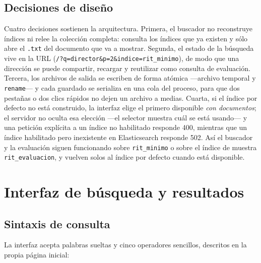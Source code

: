 \documentclass[11pt,spanish]{article}
\begin{document}
\subsection{Decisiones de diseño}
\label{sec:decisiones-arquitectura}

Cuatro decisiones sostienen la arquitectura. Primera, el buscador no
reconstruye índices ni relee la colección completa: consulta los índices que ya
existen y sólo abre el \texttt{.txt} del documento que va a mostrar. Segunda,
el estado de la búsqueda vive en la URL (\texttt{/?q=director\&p=2\&indice=rit\_minimo}),
de modo que una dirección se puede compartir, recargar y reutilizar como
consulta de evaluación. Tercera, los archivos de salida se escriben de forma
atómica ---archivo temporal y \texttt{rename}--- y cada guardado se serializa
en una cola del proceso, para que dos pestañas o dos clics rápidos no dejen un
archivo a medias. Cuarta, si el índice por defecto no está construido, la
interfaz elige el primero disponible \emph{con documentos}; el servidor no
oculta esa elección ---el selector muestra cuál se está usando--- y una petición
explícita a un índice no habilitado responde 400, mientras que un índice
habilitado pero inexistente en Elasticsearch responde 502. Así el buscador y la
evaluación siguen funcionando sobre \texttt{rit\_minimo} o sobre el índice de
muestra \texttt{rit\_evaluacion}, y vuelven solos al índice por defecto cuando
está disponible.

\section{Interfaz de búsqueda y resultados}
\label{sec:busqueda}

\subsection{Sintaxis de consulta}

La interfaz acepta palabras sueltas y cinco operadores sencillos, descritos en
la propia página inicial:
\end{document}
